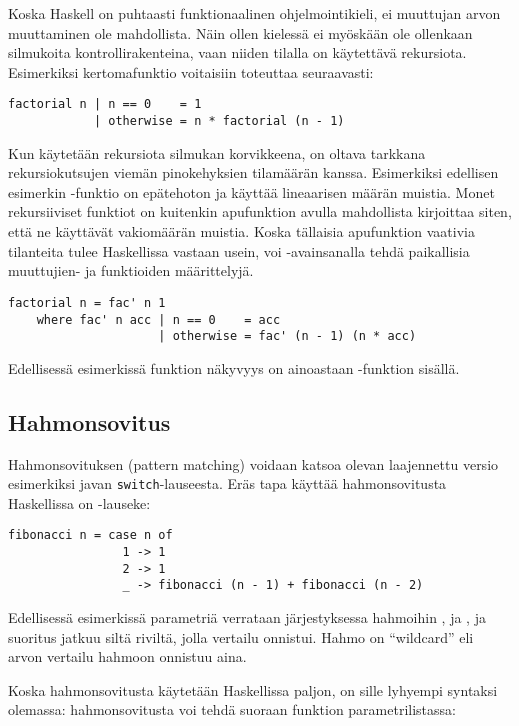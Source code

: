 Koska Haskell on puhtaasti funktionaalinen ohjelmointikieli,
ei muuttujan arvon muuttaminen ole mahdollista.
Näin ollen kielessä ei myöskään ole ollenkaan silmukoita kontrollirakenteina,
vaan niiden tilalla on käytettävä rekursiota.
Esimerkiksi kertomafunktio voitaisiin toteuttaa seuraavasti:

\begin{verbatim}
factorial n | n == 0    = 1
            | otherwise = n * factorial (n - 1)
\end{verbatim}

Kun käytetään rekursiota silmukan korvikkeena,
on oltava tarkkana rekursiokutsujen viemän pinokehyksien tilamäärän kanssa.
Esimerkiksi edellisen esimerkin -funktio on epätehoton ja käyttää lineaarisen määrän muistia.
Monet rekursiiviset funktiot on kuitenkin apufunktion avulla mahdollista kirjoittaa siten,
että ne käyttävät vakiomäärän muistia.
Koska tällaisia apufunktion vaativia tilanteita tulee Haskellissa vastaan usein,
voi -avainsanalla tehdä paikallisia muuttujien- ja funktioiden määrittelyjä.

\begin{verbatim}
factorial n = fac' n 1
    where fac' n acc | n == 0    = acc
                     | otherwise = fac' (n - 1) (n * acc)
\end{verbatim}

Edellisessä esimerkissä funktion  näkyvyys on ainoastaan -funktion sisällä.

\subsection{Hahmonsovitus}
Hahmonsovituksen (pattern matching) voidaan katsoa olevan laajennettu versio esimerkiksi javan \texttt{switch}-lauseesta.
Eräs tapa käyttää hahmonsovitusta Haskellissa on -lauseke:
\begin{verbatim}
fibonacci n = case n of
                1 -> 1
                2 -> 1
                _ -> fibonacci (n - 1) + fibonacci (n - 2)
\end{verbatim}
Edellisessä esimerkissä parametriä  verrataan järjestyksessa hahmoihin ,  ja \Haskell{\_},
ja suoritus jatkuu siltä riviltä, jolla vertailu onnistui.
Hahmo \Haskell{\_} on ``wildcard'' eli arvon vertailu hahmoon onnistuu aina.

Koska hahmonsovitusta käytetään Haskellissa paljon, on sille lyhyempi syntaksi olemassa:
hahmonsovitusta voi tehdä suoraan funktion parametrilistassa:

